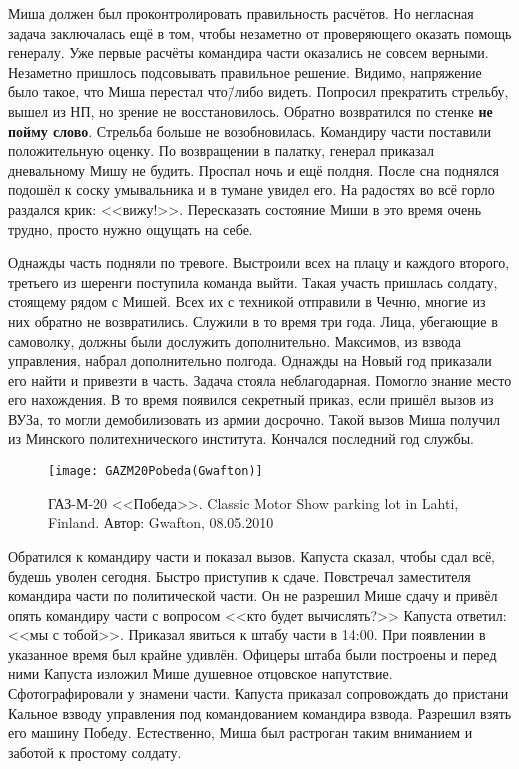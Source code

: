 Миша должен был проконтролировать правильность расчётов. Но негласная задача заключалась ещё в том, чтобы незаметно от проверяющего оказать помощь генералу. Уже первые расчёты командира части оказались не совсем верными. Незаметно пришлось подсовывать правильное решение. Видимо, напряжение было такое, что Миша перестал что\=/либо видеть. Попросил прекратить стрельбу, вышел из НП, но зрение не восстановилось. Обратно возвратился по стенке \textbf{не пойму слово}. Стрельба больше не возобновилась. Командиру части поставили положительную оценку. По возвращении в палатку, генерал приказал дневальному Мишу не будить. Проспал ночь и ещё полдня. После сна поднялся подошёл к соску умывальника и в тумане увидел его. На радостях во всё горло раздался крик: <<вижу!>>. Пересказать состояние Миши в это время очень трудно, просто нужно ощущать на себе.

Однажды часть подняли по тревоге. Выстроили всех на плацу и каждого второго, третьего из шеренги поступила команда выйти. Такая участь пришлась солдату, стоящему рядом с Мишей. Всех их с техникой отправили в Чечню, многие из них обратно не возвратились. Служили в то время три года. Лица, убегающие в самоволку, должны были дослужить дополнительно. Максимов, из взвода управления, набрал дополнительно полгода. Однажды на Новый год приказали его найти и привезти в часть. Задача стояла неблагодарная. Помогло знание место его нахождения. В то время появился секретный приказ, если пришёл вызов из ВУЗа, то могли демобилизовать из армии досрочно. Такой вызов Миша получил из Минского политехнического института. Кончался последний год службы.

\begin{wrapfigure}{O}{.4\textwidth}
\centering
\texttt{[image: GAZM20Pobeda(Gwafton)]}
\caption{ГАЗ-М-20 <<Победа>>. Classic Motor Show parking lot in Lahti, Finland. Автор: Gwafton, 08.05.2010}
\label{fig:GAZM20Pobeda(Gwafton)}
\end{wrapfigure}

Обратился к командиру части и показал вызов. Капуста сказал, чтобы сдал всё, будешь уволен сегодня. Быстро приступив к сдаче. Повстречал заместителя командира части по политической части. Он не разрешил Мише сдачу и привёл опять командиру части с вопросом <<кто будет вычислять?>> Капуста ответил: <<мы с тобой>>. Приказал явиться к штабу части в 14:00. При появлении в указанное время был крайне удивлён. Офицеры штаба были построены и перед ними Капуста изложил Мише душевное отцовское напутствие. Сфотографировали у знамени части. Капуста приказал сопровождать до пристани Кальное взводу управления под командованием командира взвода. Разрешил взять его машину Победу. Естественно, Миша был растроган таким вниманием и заботой к простому солдату. 

